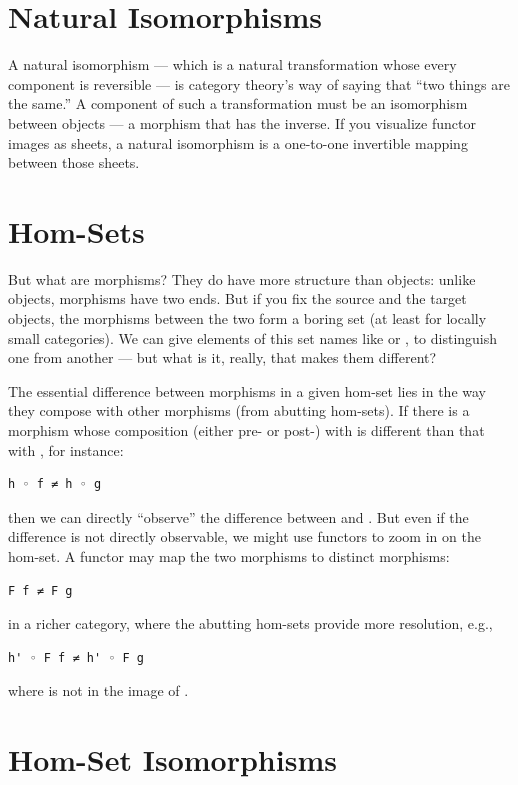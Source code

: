 \section{Natural Isomorphisms}\label{natural-isomorphisms}

A natural isomorphism --- which is a natural transformation whose every
component is reversible --- is category theory's way of saying that
``two things are the same.'' A component of such a transformation must
be an isomorphism between objects --- a morphism that has the inverse.
If you visualize functor images as sheets, a natural isomorphism is a
one-to-one invertible mapping between those sheets.

\section{Hom-Sets}\label{hom-sets}

But what are morphisms? They do have more structure than objects: unlike
objects, morphisms have two ends. But if you fix the source and the
target objects, the morphisms between the two form a boring set (at
least for locally small categories). We can give elements of this set
names like  or , to distinguish one from another ---
but what is it, really, that makes them different?

The essential difference between morphisms in a given hom-set lies in
the way they compose with other morphisms (from abutting hom-sets). If
there is a morphism  whose composition (either pre- or post-)
with  is different than that with , for instance:

\begin{verbatim}
h ◦ f ≠ h ◦ g
\end{verbatim}
then we can directly ``observe'' the difference between  and
. But even if the difference is not directly observable, we
might use functors to zoom in on the hom-set. A functor  may
map the two morphisms to distinct morphisms:

\begin{verbatim}
F f ≠ F g
\end{verbatim}
in a richer category, where the abutting hom-sets provide more
resolution, e.g.,

\begin{verbatim}
h' ◦ F f ≠ h' ◦ F g
\end{verbatim}
where  is not in the image of .

\section{Hom-Set Isomorphisms}\label{hom-set-isomorphisms}

